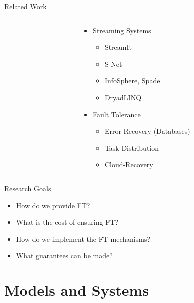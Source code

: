 \documentclass{beamer}
\begin{document}
\begin{frame}{Related Work}
\begin{columns}
\begin{column}{5cm}
\end{column}
\begin{column}{5cm}
\begin{itemize}
	\item Streaming Systems
		\begin{itemize}
			\item StreamIt \cite{thies10}
			\item S-Net \cite{pen09}
			\item InfoSphere, Spade \cite{ged08}
			\item DryadLINQ \cite{yu08}
		\end{itemize}
	\item Fault Tolerance
		\begin{itemize}
			\item Error Recovery (Databases) \cite{dbrec}
			\item Task Distribution \cite{lit07}
			\item Cloud-Recovery \cite{ree06}
		\end{itemize}
\end{itemize}
\end{column}
\end{columns}
\end{frame}

\begin{frame}{Research Goals}
\begin{itemize}
	\item How do we provide FT?
	\item What is the cost of ensuring FT?
	\item How do we implement the FT mechanisms?
	\item What guarantees can be made?
\end{itemize}
\end{frame}

\section{Models and Systems}
\end{document}
